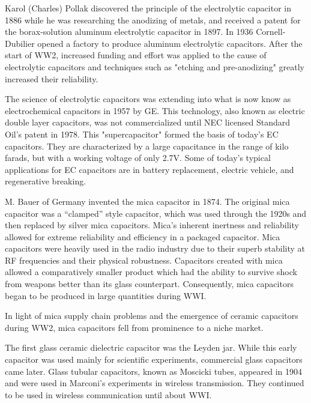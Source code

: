 Karol (Charles) Pollak discovered the principle of the electrolytic capacitor in 1886 while he was researching the anodizing of metals, and received a patent for the borax-solution aluminum electrolytic capacitor in 1897.  
In 1936 Cornell-Dubilier opened a factory to produce aluminum electrolytic capacitors. 
After the start of WW2, increased funding and effort was applied to the cause of electrolytic capacitors and techniques such as "etching and pre-anodizing" greatly increased their reliability.\cite{deis_hist}\cite{wiki_elec}

The science of electrolytic capacitors was extending into what is now know as electrochemical capacitors in 1957 by GE. This technology, also known as electric double layer capacitors, was not commercialized until NEC licensed Standard Oil's patent in 1978.\cite{electrochem_intro} This "supercapacitor" formed the basis of today's EC capacitors. They are characterized by a large capacitance in the range of kilo farads, but with a working voltage of only 2.7V.\cite{electrochem_intro} Some of today's typical applications for EC capacitors are in battery replacement, electric vehicle, and regenerative breaking.

\nocite{hh}
\nocite{capGuide_mica}
M. Bauer of Germany invented the mica capacitor in 1874. The original mica capacitor was a ``clamped'' style capacitor, which was used through the 1920s\cite{wiki_mica} and then replaced by silver mica capacitors.\cite{learn_caps}
Mica's inherent inertness and reliability allowed for extreme reliability and efficiency in a packaged capacitor.\cite{tedds_mica} Mica capacitors were heavily used in the radio industry due to their superb stability at RF frequencies and their physical robustness.\cite{radio_mica}
Capacitors created with mica allowed a comparatively smaller product\cite[f.~37-41]{dumInv} which had the ability to survive shock from weapons better than its glass counterpart. Consequently, mica capacitors began to be produced in large quantities during WWI.

In light of mica supply chain problems and the emergence of ceramic capacitors during WW2, mica capacitors fell from prominence to a niche market.\cite[Ch 3, Sec II]{cerMaterials}

The first glass ceramic dielectric capacitor was the Leyden jar. While this early capacitor was used mainly for scientific experiments, commercial glass capacitors came later. 
Glass tubular capacitors, known as Moscicki tubes, appeared in 1904 and were used in Marconi's experiments in wireless transmission. They continued to be used in wireless communication until about WWI.\cite[p.~102]{dumInv}

